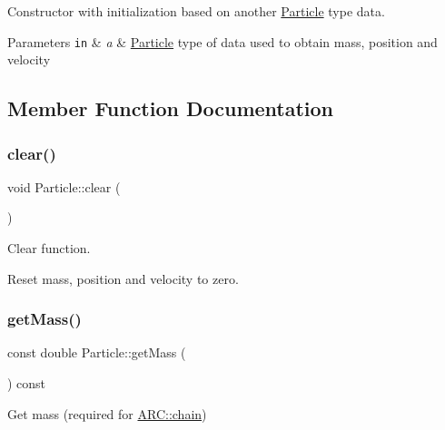 Constructor with initialization based on another \hyperlink{classParticle}{Particle} type data. 


\begin{DoxyParams}[1]{Parameters}
\mbox{\tt in}  & {\em a} & \hyperlink{classParticle}{Particle} type of data used to obtain mass, position and velocity \\
\hline
\end{DoxyParams}


\subsection{Member Function Documentation}
\hypertarget{classParticle_ab0eea4368ee797652c528949ab4ac563}{}\label{classParticle_ab0eea4368ee797652c528949ab4ac563} 
\subsubsection{\texorpdfstring{clear()}{clear()}}
{\footnotesize\ttfamily void Particle\+::clear (\begin{DoxyParamCaption}{ }\end{DoxyParamCaption})\hspace{0.3cm}{\ttfamily [inline]}}



Clear function. 

Reset mass, position and velocity to zero. \hypertarget{classParticle_a2576aff503f68e78ced91406512b1255}{}\label{classParticle_a2576aff503f68e78ced91406512b1255} 
\subsubsection{\texorpdfstring{get\+Mass()}{getMass()}}
{\footnotesize\ttfamily const double Particle\+::get\+Mass (\begin{DoxyParamCaption}{ }\end{DoxyParamCaption}) const\hspace{0.3cm}{\ttfamily [inline]}}



Get mass (required for \hyperlink{classARC_1_1chain}{A\+R\+C\+::chain}) 

